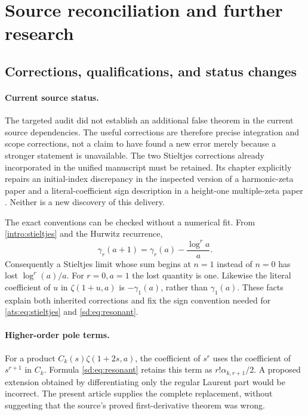 \section{Source reconciliation and further research}
\label{audit:section}

\subsection{Corrections, qualifications, and status changes}

\paragraph{Current source status.}
The targeted audit did not establish an additional false theorem in the
current source dependencies. The useful corrections are therefore
precise integration and scope corrections, not a claim to have found
a new error merely because a stronger statement is unavailable.
The two Stieltjes corrections already incorporated in the unified
manuscript must be retained. Its chapter
 explicitly repairs an
initial-index discrepancy in the inspected version of a harmonic-zeta
paper and a literal-coefficient sign description in a height-one
multiple-zeta paper \cite{ProveIt}. Neither is a new discovery of this
delivery.

The exact conventions can be checked without a numerical fit. From
\eqref{intro:stieltjes} and the Hurwitz recurrence,
\[
 \gamma_r(a+1)=\gamma_r(a)-\frac{\log^r a}{a}.
\]
Consequently a Stieltjes limit whose sum begins at $n=1$ instead of
$n=0$ has lost $\log^r(a)/a$. For $r=0,a=1$ the lost quantity is
one. Likewise the literal coefficient of $u$ in
$\zeta(1+u,a)$ is $-\gamma_1(a)$, rather than $\gamma_1(a)$.
These facts explain both inherited corrections and fix the sign
convention needed for \eqref{ats:eq:stieltjes} and
\eqref{sd:eq:resonant}.

\paragraph{Higher-order pole terms.}
For a product $C_k(s)\zeta(1+2s,a)$, the coefficient of $s^r$
uses the coefficient of $s^{r+1}$ in $C_k$. Formula
\eqref{sd:eq:resonant} retains this term as
$r!\alpha_{k,r+1}/2$. A proposed extension obtained by differentiating
only the regular Laurent part would be incorrect. The present article
supplies the complete replacement, without suggesting that the
source's proved first-derivative theorem was wrong.

